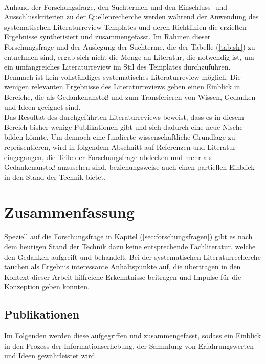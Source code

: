         \\
        Anhand der Forschungsfrage, den Suchtermen und den Einschluss- und Ausschlusskriterien zu der Quellenrecherche werden während der Anwendung
        des systematischen Literaturreview-Templates und deren Richtlinien die erzielten Ergebnisse synthetisiert und zusammengefasst. Im Rahmen 
        dieser Forschungsfrage und der Auslegung der Suchterme, die der Tabelle (\ref{tab:slr}) zu entnehmen sind, ergab sich nicht die Menge an Literatur, 
        die notwendig ist, um ein umfangreiches Literaturreview im Stil des Templates durchzuführen. Demnach ist kein vollständiges systematisches Literaturreview 
        möglich. Die wenigen relevanten Ergebnisse des Literaturreviews geben einen Einblick in Bereiche, die als Gedankenanstoß und zum Transferieren von 
        Wissen, Gedanken und Ideen geeignet sind. 
        \\
        \linebreak
        Das Resultat des durchgeführten Literaturreviews beweist, dass es in diesem Bereich bisher wenige Publikationen gibt und sich dadurch eine neue Nische bilden könnte. 
        Um dennoch eine fundierte wissenschaftliche Grundlage zu repräsentieren, wird in 
        folgendem Abschnitt auf Referenzen und Literatur eingegangen, die Teile der Forschungsfrage abdecken und mehr als Gedankenanstoß 
        anzusehen sind, beziehungsweise auch einen partiellen Einblick in den Stand der Technik bietet. 
\section{Zusammenfassung} 
    Speziell auf die Forschungsfrage in Kapitel (\ref{sec:forschungsfragen}) gibt es nach dem heutigen Stand der Technik dazu keine entsprechende  
    Fachliteratur, welche den Gedanken aufgreift und behandelt. 
    Bei der systematischen Literaturrecherche tauchen als Ergebnis interessante Anhaltspunkte auf, die übertragen in den Kontext dieser Arbeit 
    hilfreiche Erkenntnisse beitragen und Impulse für die Konzeption geben konnten. 
    
    \subsection{Publikationen}
    \label{subsec:publications}
        Im Folgenden werden diese aufgegriffen und zusammengefasst, sodass ein Einblick in den Prozess der 
        Informationserhebung, der Sammlung von Erfahrungswerten und Ideen gewährleistet wird.
        
